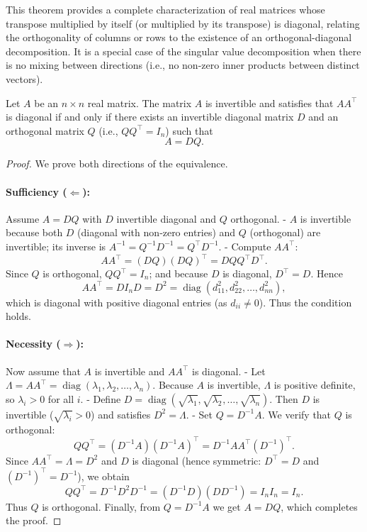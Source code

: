 This theorem provides a complete characterization of real matrices whose transpose multiplied by itself (or multiplied by its transpose) is diagonal, relating the orthogonality of columns or rows to the existence of an orthogonal-diagonal decomposition. It is a special case of the singular value decomposition when there is no mixing between directions (i.e., no non-zero inner products between distinct vectors).


\begin{theorem}[4.2]
Let \(A\) be an \(n \times n\) real matrix. The matrix \(A\) is invertible and satisfies that \(AA^{\top}\) is diagonal if and only if there exists an invertible diagonal matrix \(D\) and an orthogonal matrix \(Q\) (i.e., \(QQ^{\top}=I_n\)) such that
\[
A = DQ.
\]
\end{theorem}

\begin{proof}
We prove both directions of the equivalence.

\paragraph{Sufficiency (\(\Leftarrow\)):}
Assume \(A = DQ\) with \(D\) invertible diagonal and \(Q\) orthogonal.
- \(A\) is invertible because both \(D\) (diagonal with non‑zero entries) and \(Q\) (orthogonal) are invertible; its inverse is \(A^{-1}=Q^{-1}D^{-1}=Q^{\top}D^{-1}\).
- Compute \(AA^{\top}\):
\[
AA^{\top} = (DQ)(DQ)^{\top} = D Q Q^{\top} D^{\top}.
\]
Since \(Q\) is orthogonal, \(QQ^{\top}=I_n\); and because \(D\) is diagonal, \(D^{\top}=D\). Hence
\[
AA^{\top} = D I_n D = D^2 = \operatorname{diag}(d_{11}^2, d_{22}^2, \dots, d_{nn}^2),
\]
which is diagonal with positive diagonal entries (as \(d_{ii}\neq 0\)). Thus the condition holds.

\paragraph{Necessity (\(\Rightarrow\)):}
Now assume that \(A\) is invertible and \(AA^{\top}\) is diagonal.
- Let \(\Lambda = AA^{\top} = \operatorname{diag}(\lambda_1,\lambda_2,\dots,\lambda_n)\). Because \(A\) is invertible, \(\Lambda\) is positive definite, so \(\lambda_i > 0\) for all \(i\).
- Define \(D = \operatorname{diag}(\sqrt{\lambda_1}, \sqrt{\lambda_2}, \dots, \sqrt{\lambda_n})\). Then \(D\) is invertible (\(\sqrt{\lambda_i}>0\)) and satisfies \(D^2 = \Lambda\).
- Set \(Q = D^{-1}A\). We verify that \(Q\) is orthogonal:
\[
QQ^{\top} = (D^{-1}A)(D^{-1}A)^{\top} = D^{-1} A A^{\top} (D^{-1})^{\top}.
\]
Since \(AA^{\top} = \Lambda = D^2\) and \(D\) is diagonal (hence symmetric: \(D^{\top}=D\) and \((D^{-1})^{\top}=D^{-1}\)), we obtain
\[
QQ^{\top} = D^{-1} D^2 D^{-1} = (D^{-1}D)(D D^{-1}) = I_n I_n = I_n.
\]
Thus \(Q\) is orthogonal.
Finally, from \(Q = D^{-1}A\) we get \(A = DQ\), which completes the proof.
\end{proof}

